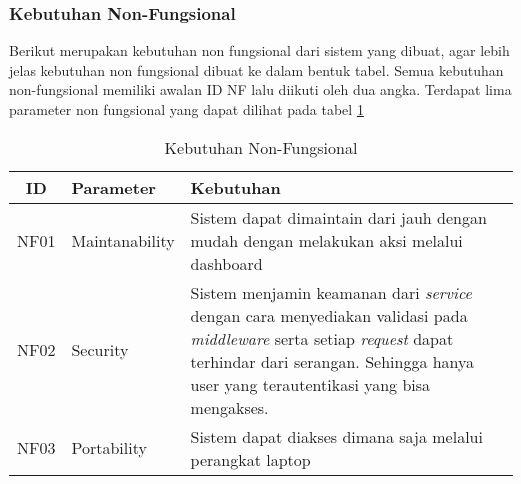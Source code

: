 \subsubsection{Kebutuhan Non-Fungsional}
Berikut merupakan kebutuhan non fungsional dari sistem yang dibuat, agar lebih jelas kebutuhan non fungsional dibuat ke dalam bentuk tabel. Semua kebutuhan non-fungsional memiliki awalan ID NF lalu diikuti oleh dua angka. Terdapat lima parameter non fungsional yang dapat dilihat pada tabel \ref{tab:kebutuhan-non-fungsional}

\bgroup
\begin{table}[ht]
  \def\arraystretch{1.7}
  \caption{Kebutuhan Non-Fungsional}
  \label{tab:kebutuhan-non-fungsional}
  \centering
  \begin{tabular}{|c|p{3cm}|p{8cm}|}
    \hline
    ID   & Parameter      & Kebutuhan                                                                                                                                                                                                                               \\
    \hline
    NF01 & Maintanability & Sistem dapat dimaintain dari jauh dengan mudah dengan melakukan aksi melalui dashboard                                                                                                                                                  \\
    \hline
    NF02 & Security       & Sistem menjamin keamanan dari \textit{service} dengan cara menyediakan validasi pada \textit{middleware} serta setiap \textit{request} dapat terhindar dari serangan. Sehingga hanya user yang terautentikasi yang bisa mengakses. \\
    \hline
    NF03 & Portability    & Sistem dapat diakses dimana saja melalui perangkat laptop                                                                                                                                                                               \\
    \hline
  \end{tabular}
\end{table}
\egroup